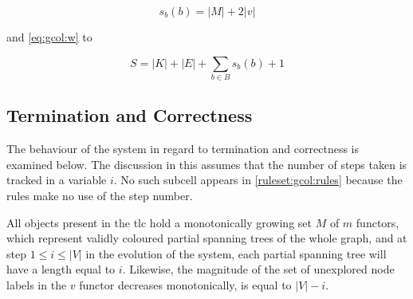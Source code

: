 \begin{equation}
    s_b(b) = |M| + 2 |v|
\end{equation}

and \cref{eq:gcol:w} to

\begin{equation}
    S = |K| + |E| + \sum_{b \in B}s_b(b) + 1
\end{equation}

\subsection{\label{sec:gcol:termination}Termination and Correctness}
The behaviour of the system in regard to termination and correctness is examined below.  The discussion in this  assumes that the number of steps taken is tracked in a variable \(i\).  No such subcell appears in \cref{ruleset:gcol:rules} because the rules make no use of the step number.

\begin{theorem}\label{theorem:gcol:grow}
All \bo{} objects present in the \gls{tlc} hold a monotonically growing set \(M\) of \(m\) \glspl{functor}, which represent validly coloured partial spanning trees of the whole graph, and at step \(1 \leq i \leq |V|\) in the evolution of the system, each partial spanning tree will have a length equal to \(i\).  Likewise, the magnitude of the set of unexplored node labels in the \(v\) functor decreases monotonically, is equal to \(|V| - i\).
\end{theorem}

